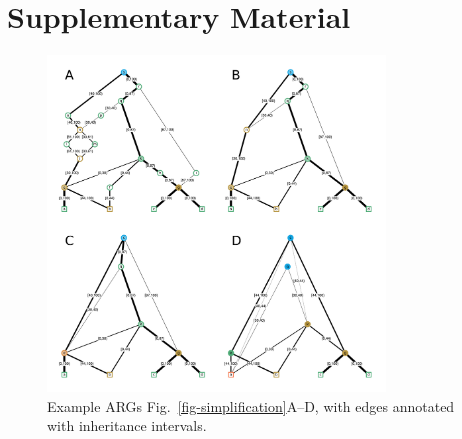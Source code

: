 \documentclass{article}
\begin{document}
\clearpage
\renewcommand\thefigure{S\arabic{figure}}
\setcounter{figure}{0}
\renewcommand\thetable{S\arabic{table}}
\setcounter{table}{0}

\section*{Supplementary Material}

\begin{figure}[ht]
	\begin{center}
		\includegraphics[width=0.8\textwidth]{illustrations/simplification-with-edges.pdf}
	\end{center}
	\caption{\label{fig-simplification-with-edges}
	Example ARGs Fig.~\ref{fig-simplification}A--D,
    with edges annotated with inheritance intervals.
	}
\end{figure}
\end{document}
